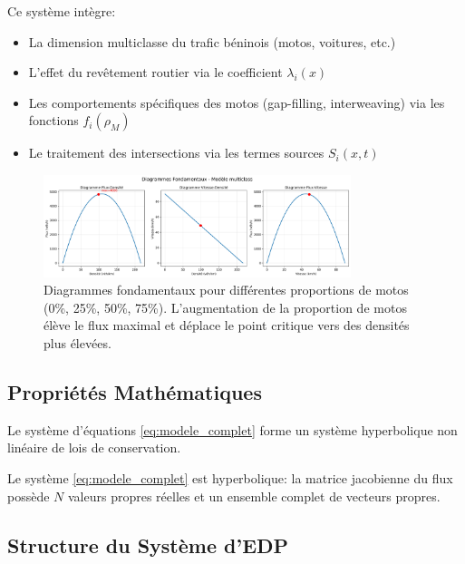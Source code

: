 Ce système intègre:
\begin{itemize}
\item La dimension multiclasse du trafic béninois (motos, voitures, etc.)
\item L'effet du revêtement routier via le coefficient $\lambda_i(x)$
\item Les comportements spécifiques des motos (gap-filling, interweaving) via les fonctions $f_i(\rho_M)$
\item Le traitement des intersections via les termes sources $S_i(x,t)$
\end{itemize}

\begin{figure}[htbp]
\centering
\includegraphics[width=0.8\textwidth]{simulations/multiclass_fundamental_diagrams.png}
\caption{Diagrammes fondamentaux pour différentes proportions de motos (0\%, 25\%, 50\%, 75\%). L'augmentation de la proportion de motos élève le flux maximal et déplace le point critique vers des densités plus élevées.}
\label{fig:diagramme_multiclasse}
\end{figure}

\subsection{Propriétés Mathématiques}
\label{subsec:proprietes_mathematiques}

Le système d'équations \eqref{eq:modele_complet} forme un système hyperbolique non linéaire de lois de conservation.

\begin{theorem}
Le système \eqref{eq:modele_complet} est hyperbolique: la matrice jacobienne du flux possède $N$ valeurs propres réelles et un ensemble complet de vecteurs propres.
\end{theorem}

\subsection{Structure du Système d'EDP}
\label{subsec:structure_edp_extension}

